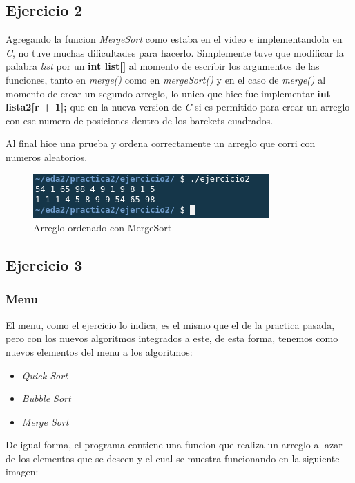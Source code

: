 \documentclass{article}
\begin{document}
		\subsection{Ejercicio 2}
		
		Agregando la funcion \emph{MergeSort} como estaba en el video e implementandola en \emph{C}, no tuve muchas dificultades para hacerlo. Simplemente tuve que modificar la palabra \emph{list} por un \textbf{int list[]} al momento de escribir los argumentos de las funciones, tanto en \emph{merge()} como en \emph{mergeSort()} y en el caso de \emph{merge()} al momento de crear un segundo arreglo, lo unico que hice fue implementar \textbf{int lista2[r + 1];} que en la nueva version de \emph{C} si es permitido para crear un arreglo con ese numero de posiciones dentro de los barckets cuadrados. 
		
		Al final hice una prueba y ordena correctamente un arreglo que corri con numeros aleatorios.
		
		\begin{figure}[H]
			\centering
			\includegraphics{images/e2.png}
			\caption{Arreglo ordenado con MergeSort}
		\end{figure}
	
		\subsection{Ejercicio 3}
		
		\subsubsection{Menu}
		
		El menu, como el ejercicio lo indica, es el mismo que el de la practica pasada, pero con los nuevos algoritmos integrados a este, de esta forma, tenemos como nuevos elementos del menu a los algoritmos:
		
		\begin{itemize}
			\item \emph{Quick Sort}
			\item \emph{Bubble Sort}
			\item \emph{Merge Sort}
		\end{itemize}
	
		De igual forma, el programa contiene una funcion que realiza un arreglo al azar de los elementos que se deseen y el cual se muestra funcionando en la siguiente imagen:
		
\end{document}
